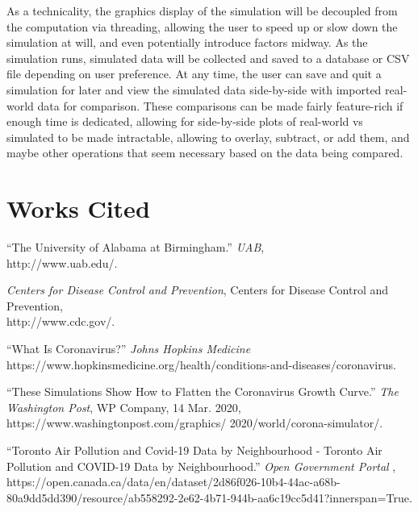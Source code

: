 \documentclass{article}
\begin{document}
    As a technicality, the graphics display of the simulation will be decoupled from the computation via threading, allowing the user to speed up or slow down the simulation at will, and even potentially introduce factors midway. As the simulation runs, simulated data will be collected and saved to a database or CSV file depending on user preference. At any time, the user can save and quit a simulation for later and view the simulated data side-by-side with imported real-world data for comparison. These comparisons can be made fairly feature-rich if enough time is dedicated, allowing for side-by-side plots of real-world vs simulated to be made intractable, allowing to overlay, subtract, or add them, and maybe other operations that seem necessary based on the data being compared.


    \section{Works Cited}

    “The University of Alabama at Birmingham.” \emph{UAB}, \\http://www.uab.edu/.
    \bigskip

    \emph{Centers for Disease Control and Prevention}, Centers for Disease Control and
    Prevention, \\http://www.cdc.gov/.
    \bigskip

    “What Is Coronavirus?” \emph{Johns Hopkins Medicine}\\
    https://www.hopkinsmedicine.org/health/conditions-and-diseases/coronavirus.
    \bigskip

    “These Simulations Show How to Flatten the Coronavirus Growth Curve.” \emph{The Washington
    Post}, WP Company, 14 Mar. 2020,
    https://www.washingtonpost.com/graphics/
    2020/world/corona-simulator/.
    \bigskip

    “Toronto Air Pollution and Covid-19 Data by Neighbourhood - Toronto Air Pollution and COVID-19 Data by Neighbourhood.” \emph{Open Government Portal} , \\https://open.canada.ca/data/en/dataset/2d86f026-10b4-44ac-a68b-80a9dd5dd390/resource/ab558292-2e62-4b71-944b-aa6c19cc5d41?innerspan=True.
\end{document}
